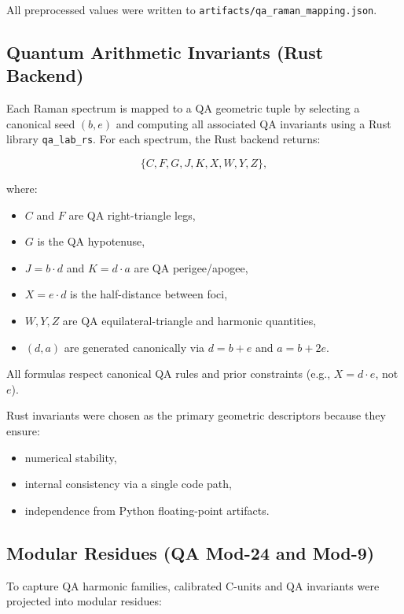 \documentclass[12pt]{article}
\begin{document}
All preprocessed values were written to \texttt{artifacts/qa\_raman\_mapping.json}.

\subsection{Quantum Arithmetic Invariants (Rust Backend)}

Each Raman spectrum is mapped to a QA geometric tuple by selecting a canonical seed $(b,e)$ and computing all
associated QA invariants using a Rust library \texttt{qa\_lab\_rs}. For each spectrum, the Rust backend returns:

\[
\{ C, F, G, J, K, X, W, Y, Z \},
\]

where:

\begin{itemize}
    \item $C$ and $F$ are QA right-triangle legs,
    \item $G$ is the QA hypotenuse,
    \item $J = b \cdot d$ and $K = d \cdot a$ are QA perigee/apogee,
    \item $X = e \cdot d$ is the half-distance between foci,
    \item $W,Y,Z$ are QA equilateral-triangle and harmonic quantities,
    \item $(d,a)$ are generated canonically via $d=b+e$ and $a=b+2e$.
\end{itemize}

All formulas respect canonical QA rules and prior constraints (e.g., $X=d\cdot e$, not $e$).

Rust invariants were chosen as the primary geometric descriptors because they ensure:

\begin{itemize}
    \item numerical stability,
    \item internal consistency via a single code path,
    \item independence from Python floating-point artifacts.
\end{itemize}

\subsection{Modular Residues (QA Mod-24 and Mod-9)}

To capture QA harmonic families, calibrated C-units and QA invariants were projected into modular residues:
\end{document}
